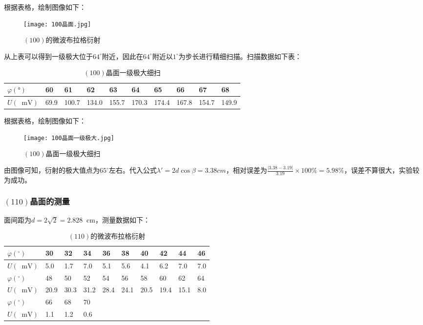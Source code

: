 \documentclass[11pt]{article}
\newcommand*{\unit}[1]{\mathop{}\!\mathrm{#1}}
\begin{document}
根据表格，绘制图像如下：

\begin{figure}[H]
  \centering
  \texttt{[image: 100晶面.jpg]}
  \caption{$(100)$的微波布拉格衍射}
\end{figure}

从上表可以得到一级极大位于$64^\circ$附近，因此在$64^\circ$附近以$1^\circ$为步长进行精细扫描。扫描数据如下表：

\begin{table}[H]
	\centering 
	\begin{tabular}{|l|l|l|l|l|l|l|l|l|l|}
		\hline
		$\varphi(°)$ &60    & 61    & 62    & 63    & 64    & 65    & 66    & 67    & 68 \\ \hline
		$U(\unit{mV})$&69.9  & 100.7  & 134.0  & 155.7  & 170.3  & 174.4  & 167.8  & 154.7  & 149.9 \\ \hline
	\end{tabular}
  \caption{$(100)$晶面一级极大细扫}
\end{table}

根据表格，绘制图像如下：

\begin{figure}[H]
  \centering
  \texttt{[image: 100晶面一级极大.jpg]}
  \caption{$(100)$晶面一级极大细扫}
\end{figure}

由图像可知，衍射的极大值点为$65^\circ$左右。代入公式$\lambda'=2d\cos \beta = 3.38 cm$，相对误差为$\frac{|3.38-3.19|}{3.19} \times 100\% = 5.98\%$，误差不算很大，实验较为成功。

\subsubsection{$(110)$晶面的测量}

面间距为$ d = 2 \sqrt{2} = 2.828 \unit{cm} $，测量数据如下：

\begin{table}[H]
	\centering
	\begin{tabular}{|l|l|l|l|l|l|l|l|l|l|}
		\hline
    $\varphi(^\circ)$ & 30   & 32  & 34   & 36  & 38  & 40   & 42   & 44   & 46   \\ \hline
		$U(\unit{mV})$ & 5.0   & 1.7   & 7.0   & 5.1   & 5.6   & 4.1   & 6.2   & 7.0   & 7.0   \\ \hline
		$\varphi(^\circ)$ & 48   & 50  & 52   & 54  & 56  & 58   & 60   & 62   & 64   \\ \hline
		$U(\unit{mV})$ &20.9  & 30.3  & 31.2  & 28.4  & 24.1  & 20.5  & 19.4  & 15.1  & 8.0     \\ \hline
		$\varphi(^\circ)$ & 66  & 68 & 70   &      &      &      &      &     &     \\ \hline
		$U(\unit{mV})$ &1.1   & 1.2   & 0.6 &      &      &      &      &     &       \\ \hline
	\end{tabular}
	  \caption{$(110)$的微波布拉格衍射}
\end{table}
\end{document}
